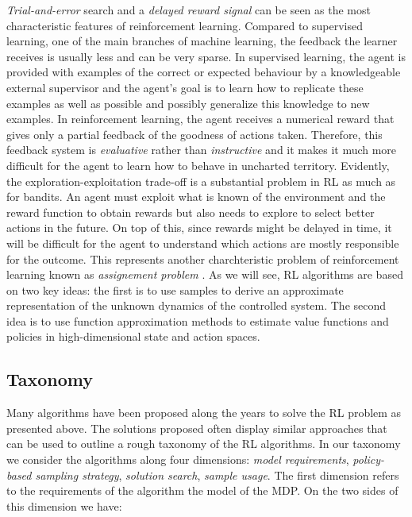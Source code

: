 \emph{Trial-and-error} search and a \emph{delayed reward signal} can be
seen as the most characteristic features of reinforcement learning. Compared to supervised learning, one of the main branches of machine learning, the feedback the learner receives is usually less and can be very sparse. In supervised learning, the agent is provided with examples of the correct or expected behaviour by a knowledgeable external supervisor and the agent’s goal is to learn how to replicate these examples as well as possible and possibly generalize this knowledge to new examples. In reinforcement learning, the agent receives a numerical reward that gives only a partial feedback of the goodness of actions taken. Therefore, this feedback system is \emph{evaluative} rather than \emph{instructive} and it makes it much more difficult for the agent to learn how to behave in uncharted territory.
Evidently, the exploration-exploitation trade-off is a substantial problem in \gls{RL} as much as for bandits. An agent must exploit what
is known of the environment and the reward function to obtain rewards but also needs to explore to select better actions in the future. On top of this, since rewards might be delayed in time, it will be difficult for the agent to understand which actions are mostly responsible for the outcome. This represents another charchteristic problem of reinforcement learning known as \emph{assignement problem} \cite{sutton2018reinforcement}. As we will see, \gls{RL} algorithms are based on two key ideas: the first is to use samples to derive an approximate representation of the unknown dynamics of the controlled system. The second idea is to use function approximation methods to estimate value functions and policies in high-dimensional state and action spaces.

\subsection{Taxonomy}
Many algorithms have been proposed along the years to solve the \gls{RL} problem as presented above. The solutions proposed often display similar approaches that can be used to outline a rough taxonomy of the \gls{RL} algorithms. In our taxonomy we consider the algorithms along four dimensions: \emph{model requirements}, \emph{policy-based sampling strategy}, \emph{solution search}, \emph{sample usage}.
The first dimension refers to the requirements of the algorithm \wrt the model of the \gls{MDP}. On the two sides of this dimension we have:

